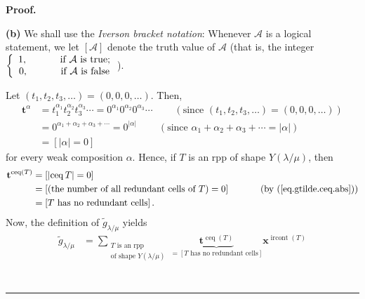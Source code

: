 \documentclass[numbers=enddot,12pt,final,onecolumn,notitlepage]{scrartcl}%
\theoremstyle{definition}
\newenvironment{proof}[1][Proof]{\noindent\textbf{#1.} }{\ \rule{0.5em}{0.5em}}
\newenvironment{verlong}{}{}
\newenvironment{vershort}{}{}
\let\sumnonlimits\sum
\renewcommand{\sum}{\sumnonlimits\limits}
\begin{document}
\begin{proof}
\begin{vershort}
\end{vershort}

\begin{verlong}
\textbf{(b)} We shall use the \textit{Iverson bracket notation}: Whenever
$\mathcal{A}$ is a logical statement, we let $\left[  \mathcal{A}\right]  $
denote the truth value of $\mathcal{A}$ (that is, the integer $\left\{
\begin{array}
[c]{c}%
1,\ \ \ \ \ \ \ \ \ \ \text{if }\mathcal{A}\text{ is true;}\\
0,\ \ \ \ \ \ \ \ \ \ \text{if }\mathcal{A}\text{ is false}%
\end{array}
\right.  $).

Let $\left(  t_{1},t_{2},t_{3},\ldots\right)  =\left(  0,0,0,\ldots\right)  $.
Then,
\begin{align*}
\mathbf{t}^{\alpha}  &  =t_{1}^{\alpha_{1}}t_{2}^{\alpha_{2}}t_{3}^{\alpha
_{3}}\cdots=0^{\alpha_{1}}0^{\alpha_{2}}0^{\alpha_{3}}\cdots
\ \ \ \ \ \ \ \ \ \ \left(  \text{since }\left(  t_{1},t_{2},t_{3}%
,\ldots\right)  =\left(  0,0,0,\ldots\right)  \right) \\
&  =0^{\alpha_{1}+\alpha_{2}+\alpha_{3}+\cdots}=0^{\left\vert \alpha
\right\vert }\ \ \ \ \ \ \ \ \ \ \left(  \text{since }\alpha_{1}+\alpha
_{2}+\alpha_{3}+\cdots=\left\vert \alpha\right\vert \right) \\
&  =\left[  \left\vert \alpha\right\vert =0\right]
\end{align*}
for every weak composition $\alpha$. Hence, if $T$ is an rpp of shape
$Y\left(  \lambda/\mu\right)  $, then%
\begin{align*}
\mathbf{t}^{\operatorname*{ceq}\left(  T\right)  }  &  =\left[  \left\vert
\operatorname*{ceq}T\right\vert =0\right] \\
&  =\left[  \left(  \text{the number of all redundant cells of }T\right)
=0\right]  \ \ \ \ \ \ \ \ \ \ \left(  \text{by (\ref{eq.gtilde.ceq.abs}%
)}\right) \\
&  =\left[  T\text{ has no redundant cells}\right]  .
\end{align*}
Now, the definition of $\widetilde{g}_{\lambda/\mu}$ yields%
\begin{align*}
\widetilde{g}_{\lambda/\mu}  &  =\sum_{\substack{T\text{ is an rpp}\\\text{of
shape }Y\left(  \lambda/\mu\right)  }}\underbrace{\mathbf{t}%
^{\operatorname*{ceq}\left(  T\right)  }}_{=\left[  T\text{ has no redundant
cells}\right]  }\mathbf{x}^{\operatorname*{ircont}\left(  T\right)  }\\

\end{align*}
\end{verlong}
\end{proof}
\end{document}
